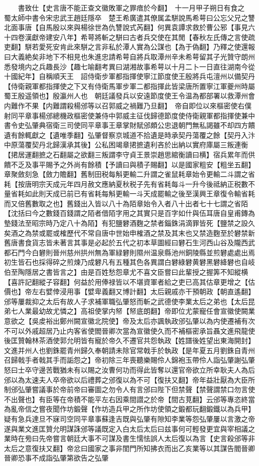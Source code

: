 　　書致仕【史言唐不能正查文徽敗軍之罪瘖於今翻】　十一月甲子朔日有食之　蜀太師中書令宋忠武王趙廷隱卒　楚王希廣遣其僚属孟駢說馬希萼曰公忘父兄之讐北面事唐【自馬殷以來與楊徐世為仇讐說式芮翻】何異袁譚求救於曹公邪【事見六十四卷漢獻帝建安八年】希萼將斬之駢曰古者兵交使在其閒【春秋左氏傳之言使疏吏翻】駢若愛死安肯此來駢之言非私於潭人實為公謀也【為于偽翻】乃釋之使還報曰大義絶矣非地下不相見也朱進忠請希萼自將兵取潭州辛未希萼留其子光贊守朗州悉發境内之兵趣長沙【趣七喻翻考異曰湖湘故事希萼以十月二卜一日直往湖南今從十國紀年】自稱順天王　詔侍衛步軍都指揮使寧江節度使王殷將兵屯澶州以備契丹【侍衛親軍都指揮使之下又有侍衛馬軍步軍二都指揮此皆梁唐所置寧江軍夔州時屬蜀王殷遥領也】殷瀛州人也　朝廷議發兵以安遠節度使王令温為都部署以救潭州會内難作不果【内難謂殺楊邠等以召郭威之禍難乃旦翻】　帝自即位以來樞密使右僕射同平章事楊邠總機政樞密使兼侍中郭威主征伐歸德節度使侍衛親軍都指揮使兼中書令史弘肇典宿衛三司使同平章事王章掌財賦邠頗公忠退朝門無私謁雖不却四方饋遺有餘輒獻之【遺唯季翻】弘肇督察京城道不拾遺是時承契丹蕩覆之餘【契丹入汴中原蕩覆契丹北歸漢承其後】公私困竭章捃摭遺利吝於出納以實府庫屬三叛連衡【捃居運翻摭之石翻屬之欲翻三叛謂李守貞王景崇趙思綰衡讀曰横】宿兵累年而供饋不乏及事平賜予之外尚有餘積【予讀曰與積子賜翻】以是國家粗安【粗坐五翻】章聚斂刻急【斂力贍翻】舊制田税每斛更輸二升謂之雀鼠耗章始令更輸二斗謂之省耗【按唐明宗天成元年四月赦文應納夏秋税子先有省耗每斗一升今後祗納正税數不量省耗如此則天成已前已有省耗每斛更輸一斗天成罷輸之後至漢興王章復令輸省耗而又倍舊數取之也】舊錢出入皆以八十為陌章始令入者八十出者七十七謂之省陌【沈括曰今之數錢百錢謂之陌者借陌字用之其實只是百字如什與伍耳唐自皇甫鏄為墊錢法至昭宗時乃定八十為陌】有犯鹽礬酒麴之禁者錙銖涓滴罪皆死【鹽禁之設久矣酒之為禁或罷或榷歷代不常自唐中世始申榷酒之禁及其末也又禁造麴至於礬禁新舊唐書食貨志皆未著言其事是必起於五代之初本草圖經曰礬石生河西山谷及隴西武都石門今白礬則晉州慈州拱州無為軍緑礬則隰州温泉縣池州銅陵縣並煎礬處處出焉初生皆石也採得碎之煎煉乃成礬凡有五種其色各異謂白礬綠礬黄礬黑礬絳礬也自岐伯至陶隱居之書皆言之】由是百姓愁怨章尤不喜文臣嘗曰此輩授之握筭不知縱横【喜許記翻縱子容翻】何益於用俸禄皆以不堪資軍者給之吏已高其估章更增之【估價也】帝左右嬖倖浸用事【嬖卑義翻又博計翻】太后親戚亦干預朝政【朝直遙翻】邠等屢裁抑之太后有故人子求補軍職弘肇怒而斬之武德使李業太后之弟也【太后昆弟七人業最幼故尤憐之】高祖使掌内帑【帑底朗翻】帝即位尤蒙寵任會宣徽使闕業意欲之【吳䖍裕出鄭州闕宣徽北院使】帝及太后亦諷執政邠弘肇以為内使遷補有次不可以外戚超居乃止内客省使閻晉卿次當為宣徽使久而不補樞密承旨聶文進飛龍使後匡贊翰林茶酒使郭允明皆有寵於帝久不遷官共怨執政【姓譜後姓望出東海開封】文進并州人也劉銖罷青州歸久奉朝請未除官常戟手於執政【是年夏五月劉銖自青州召歸戟手者戟其手而詬怨之】帝初除三年喪聽樂賜伶人錦袍玉帶伶人詣弘肇謝弘肇怒曰士卒守邊苦戰猶未有以賜之汝曹何功而得此皆奪以還官帝欲立所幸耿夫人為后邠以為太速夫人卒帝欲以后禮葬之邠復以為不可【復扶又翻】帝年益壯厭為大臣所制邠弘肇嘗議事於帝前帝曰審圖之勿令人有言邠曰陛下但禁聲【禁聲謂禁口勿言使不出聲也】有臣等在帝積不能平左右因乘間譛之於帝【間古莧翻】云邠等專恣終當為亂帝信之嘗夜聞作坊鍛聲【作坊造兵甲之所作坊使領之鍛都玩翻鍛鐵以為兵甲】疑有急兵達旦不寐司空同平章事蘇逢吉既與弘肇有隙知李業等怨弘肇屢以言激之帝遂與業文進匡贊允明謀誅邠等議既定入白太后太后曰兹事何可輕發更宜與宰相議之業時在㫄曰先帝嘗言朝廷大事不可謀及書生懦怯誤人太后復以為言【史言殺邠等非太后之意復扶又翻】帝忿曰國家之事非閨門所知拂衣而出乙亥業等以其謀告閻晉卿晉卿恐事不成詣弘肇第欲告之弘肇